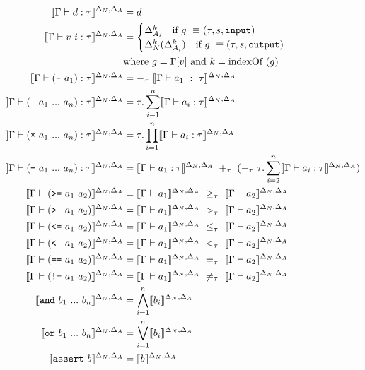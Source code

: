 \begin{align}
    \semenv{\Gamma\vdash{d}:\tau} &= d \label{eq:double}\\
    \semenv{\Gamma\vdash{v~i}:\tau} &= 
    \begin{cases}
        \Delta_{A_i}^k\quad\text{if}~g~\equiv (\tau,s,\texttt{input})\\
        \Delta_{N}^k(\Delta_{A_i}^k)\quad\text{if}~g~\equiv (\tau,s,\texttt{output})\\
    \end{cases} \\
    &\text{where}~g = \Gamma[v]~\text{and}~k = \text{indexOf}~(g)\notag\\
    \semenv{\Gamma\vdash(\text{\texttt{-}}~a_1):\tau} &= -_\tau~\semenv{\Gamma\vdash{a_1}~:~\tau} \label{eq:negation}\\
    \semenv{\Gamma\vdash(\text{\texttt{+}}~a_1~...~a_n):\tau} &= \tau.\sum^{n}_{i=1}\semenv{\Gamma\vdash{a_i}:\tau} \\
    \semenv{\Gamma\vdash(\text{\texttt{×}}~a_1~...~a_n):\tau} &= \tau.\prod^{n}_{i=1}\semenv{\Gamma\vdash{a_i}:\tau} \\
    \semenv{\Gamma\vdash(\text{\texttt{-}}~a_1~...~a_n):\tau} &= \semenv{\Gamma\vdash{a_1}:\tau}~+_\tau~(-_\tau~\tau.\sum^{n}_{i=2}\semenv{\Gamma\vdash{a_i}:\tau}) \label{eq:minus}\\
    \semenv{\Gamma\vdash(\text{\texttt{>=}}~a_1~a_2)} &= \semenv{\Gamma\vdash{a_1}}~\geq_\tau~\semenv{\Gamma\vdash{a_2}} \label{eq:greaterEqual}\\
    \semenv{\Gamma\vdash(\text{\texttt{> }}~a_1~a_2)} &= \semenv{\Gamma\vdash{a_1}}~>_\tau~\semenv{\Gamma\vdash{a_2}} \\
    \semenv{\Gamma\vdash(\text{\texttt{<=}}~a_1~a_2)} &= \semenv{\Gamma\vdash{a_1}}~\leq_\tau~\semenv{\Gamma\vdash{a_2}} \\
    \semenv{\Gamma\vdash(\text{\texttt{< }}~a_1~a_2)} &= \semenv{\Gamma\vdash{a_1}}~<_\tau~\semenv{\Gamma\vdash{a_2}} \\
    \semenv{\Gamma\vdash(\text{\texttt{==}}~a_1~a_2)} &= \semenv{\Gamma\vdash{a_1}}~=_\tau~\semenv{\Gamma\vdash{a_2}} \\
    \semenv{\Gamma\vdash(\text{\texttt{!=}}~a_1~a_2)} &= \semenv{\Gamma\vdash{a_1}}~\neq_\tau~\semenv{\Gamma\vdash{a_2}} \label{eq:notEqual}\\
    \semenv{\text{\texttt{and}}~b_1~...~b_n} &=\bigwedge^{n}_{i=1}\semenv{b_i}\\
    \semenv{\text{\texttt{or}}~b_1~...~b_n} &=\bigvee^{n}_{i=1}\semenv{b_i}\\
    \semenv{\text{\texttt{assert}}~b} &= \semenv{b}
\end{align}